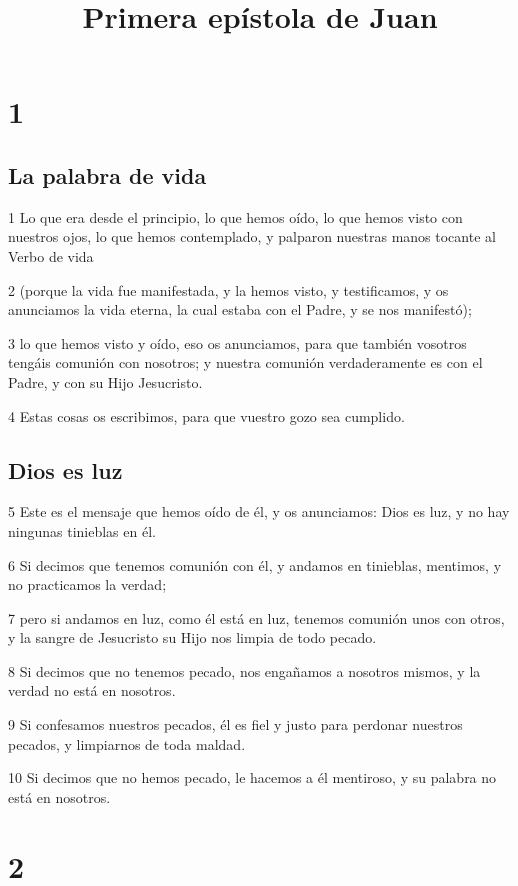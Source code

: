 
\title{Primera epístola de Juan}


\chapter{1}

\section*{La palabra de vida}

\par 1 Lo que era desde el principio, lo que hemos oído, lo que hemos visto con nuestros ojos, lo que hemos contemplado, y palparon nuestras manos tocante al Verbo de vida
\par 2 (porque la vida fue manifestada, y la hemos visto, y testificamos, y os anunciamos la vida eterna, la cual estaba con el Padre, y se nos manifestó);
\par 3 lo que hemos visto y oído, eso os anunciamos, para que también vosotros tengáis comunión con nosotros; y nuestra comunión verdaderamente es con el Padre, y con su Hijo Jesucristo.
\par 4 Estas cosas os escribimos, para que vuestro gozo sea cumplido.

\section*{Dios es luz}

\par 5 Este es el mensaje que hemos oído de él, y os anunciamos: Dios es luz, y no hay ningunas tinieblas en él.
\par 6 Si decimos que tenemos comunión con él, y andamos en tinieblas, mentimos, y no practicamos la verdad;
\par 7 pero si andamos en luz, como él está en luz, tenemos comunión unos con otros, y la sangre de Jesucristo su Hijo nos limpia de todo pecado.
\par 8 Si decimos que no tenemos pecado, nos engañamos a nosotros mismos, y la verdad no está en nosotros.
\par 9 Si confesamos nuestros pecados, él es fiel y justo para perdonar nuestros pecados, y limpiarnos de toda maldad.
\par 10 Si decimos que no hemos pecado, le hacemos a él mentiroso, y su palabra no está en nosotros.

\chapter{2}

